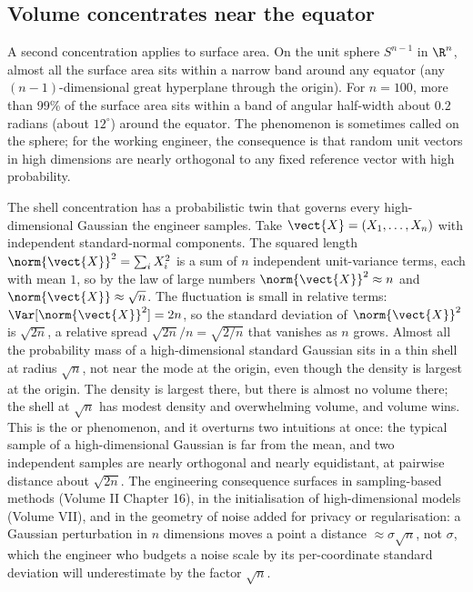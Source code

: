 

\subsection{Volume concentrates near the equator}

A second concentration applies to surface area. On the unit sphere
$S^{n - 1}$ in $\R^{n}$, almost all the surface area sits within a
narrow band around any equator (any $(n - 1)$-dimensional great
hyperplane through the origin). For $n = 100$, more than 99\% of the
surface area sits within a band of angular half-width about
$0.2$ radians (about $12^{\circ}$) around the equator. The
phenomenon is sometimes called  on
the sphere; for the working engineer, the consequence is that random
unit vectors in high dimensions are nearly orthogonal to any fixed
reference vector with high probability.

\begin{mastery}
The shell concentration has a probabilistic twin that governs every
high-dimensional Gaussian the engineer samples. Take
$\vect{X} = (X_{1}, \ldots, X_{n})$ with independent standard-normal
components. The squared length $\norm{\vect{X}}^{2} = \sum_{i} X_{i}^{2}$
is a sum of $n$ independent unit-variance terms, each with mean $1$, so
by the law of large numbers $\norm{\vect{X}}^{2} \approx n$ and
$\norm{\vect{X}} \approx \sqrt{n}$. The fluctuation is small in relative
terms: $\Var[\norm{\vect{X}}^{2}] = 2n$, so the standard deviation of
$\norm{\vect{X}}^{2}$ is $\sqrt{2n}$, a relative spread
$\sqrt{2n}/n = \sqrt{2/n}$ that vanishes as $n$ grows. Almost all the
probability mass of a high-dimensional standard Gaussian sits in a thin
shell at radius $\sqrt{n}$, not near the mode at the origin, even though
the density is largest at the origin. The density is largest there, but
there is almost no volume there; the shell at $\sqrt{n}$ has modest
density and overwhelming volume, and volume wins. This is the
 or  phenomenon, and it
overturns two intuitions at once: the typical sample of a
high-dimensional Gaussian is far from the mean, and two independent
samples are nearly orthogonal and nearly equidistant, at pairwise
distance about $\sqrt{2n}$. The engineering consequence surfaces in
sampling-based methods (Volume II Chapter 16), in the initialisation of
high-dimensional models (Volume VII), and in the geometry of noise added
for privacy or regularisation: a Gaussian perturbation in $n$ dimensions
moves a point a distance $\approx\sigma\sqrt{n}$, not $\sigma$, which the
engineer who budgets a noise scale by its per-coordinate standard
deviation will underestimate by the factor $\sqrt{n}$.
\end{mastery}

